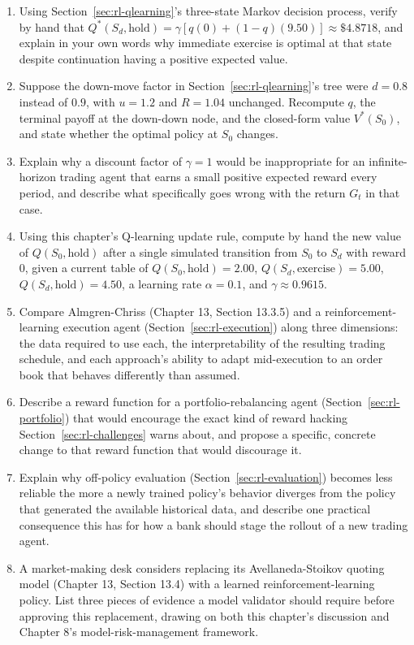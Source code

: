\documentclass[../ai_in_finance]{subfiles}
\begin{document}
\begin{enumerate}
    \item Using Section~\ref{sec:rl-qlearning}'s three-state Markov decision process, verify by hand that $Q^*(S_d, \text{hold}) = \gamma[q(0) + (1-q)(9.50)] \approx \$4.8718$, and explain in your own words why immediate exercise is optimal at that state despite continuation having a positive expected value.
    \item Suppose the down-move factor in Section~\ref{sec:rl-qlearning}'s tree were $d=0.8$ instead of $0.9$, with $u=1.2$ and $R=1.04$ unchanged. Recompute $q$, the terminal payoff at the down-down node, and the closed-form value $V^*(S_0)$, and state whether the optimal policy at $S_0$ changes.
    \item Explain why a discount factor of $\gamma=1$ would be inappropriate for an infinite-horizon trading agent that earns a small positive expected reward every period, and describe what specifically goes wrong with the return $G_t$ in that case.
    \item Using this chapter's Q-learning update rule, compute by hand the new value of $Q(S_0,\text{hold})$ after a single simulated transition from $S_0$ to $S_d$ with reward $0$, given a current table of $Q(S_0,\text{hold})=2.00$, $Q(S_d,\text{exercise})=5.00$, $Q(S_d,\text{hold})=4.50$, a learning rate $\alpha=0.1$, and $\gamma\approx0.9615$.
    \item Compare Almgren-Chriss (Chapter 13, Section 13.3.5) and a reinforcement-learning execution agent (Section~\ref{sec:rl-execution}) along three dimensions: the data required to use each, the interpretability of the resulting trading schedule, and each approach's ability to adapt mid-execution to an order book that behaves differently than assumed.
    \item Describe a reward function for a portfolio-rebalancing agent (Section~\ref{sec:rl-portfolio}) that would encourage the exact kind of reward hacking Section~\ref{sec:rl-challenges} warns about, and propose a specific, concrete change to that reward function that would discourage it.
    \item Explain why off-policy evaluation (Section~\ref{sec:rl-evaluation}) becomes less reliable the more a newly trained policy's behavior diverges from the policy that generated the available historical data, and describe one practical consequence this has for how a bank should stage the rollout of a new trading agent.
    \item A market-making desk considers replacing its Avellaneda-Stoikov quoting model (Chapter 13, Section 13.4) with a learned reinforcement-learning policy. List three pieces of evidence a model validator should require before approving this replacement, drawing on both this chapter's discussion and Chapter 8's model-risk-management framework.

\end{enumerate}
\end{document}
